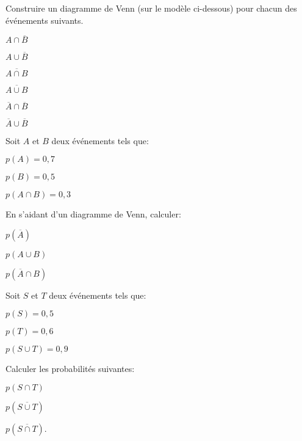 \begin{exercice} Construire un diagramme de Venn (sur le modèle ci-dessous) pour chacun des événements suivants.
  \begin{colitemize}{3}
  	\item $A\cap \overline{B}$
  	\item $A\cup \overline{B}$  	
  	\item $\overline{A\cap B}$
  	\item $\overline{A\cup B}$  	
  	\item $\overline{A}\cap \overline{B}$
  	\item $\overline{A}\cup \overline{B}$
  \end{colitemize}
  

\end{exercice}

\begin{exercice}
 Soit $A$ et $B$ deux événements tels que:
 \begin{colitemize}{2}
 \item $p(A)=0,7$
 \item $p(B)=0,5$
 \item $p(A\cap B)=0,3$
\end{colitemize} 
En s'aidant d'un diagramme de Venn, calculer:
\begin{colenumerate}{3}
\item $p\left(\overline{A}\right)$
\item $p(A\cup B)$
\item $p\left(\overline{A}\cap B\right)$
\end{colenumerate} 
\end{exercice}

\begin{exercice}
 Soit $S$ et $T$ deux événements tels que:
 \begin{colitemize}{2}
 \item $p(S)=0,5$
 \item $p(T)=0,6$
 \item $p(S\cup T)=0,9$
 \end{colitemize}
 Calculer les probabilités suivantes:
 \begin{colenumerate}{3}
 \item $p(S\cap T)$
 \item $p\left(\overline{S\cup T}\right)$
 \item $p\left(\overline{S\cap T}\right)$.
 \end{colenumerate}
\end{exercice}

